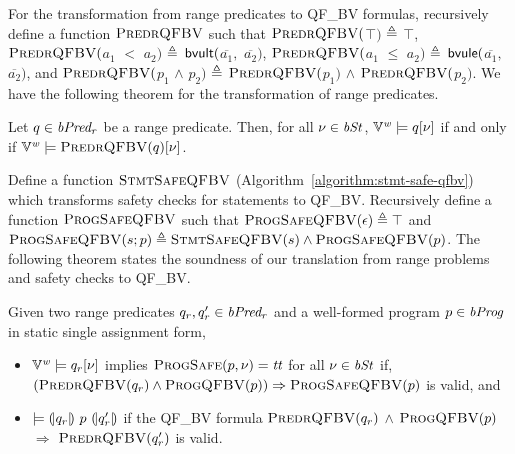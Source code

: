 For the transformation from range predicates to QF\_BV formulas, recursively define a function $\textsc{PredrQFBV}$ such that $\textsc{PredrQFBV}($$\top)$ $\triangleq$ $\top$, $\textsc{PredrQFBV}($$a_1$ $<$ $a_2)$ $\triangleq$ $\mbox{\textsf{bvult}}($$\overline{a_1},$ $\overline{a_2})$, $\textsc{PredrQFBV}($$a_1$ $\leq$ $a_2)$ $\triangleq$ $\mbox{\textsf{bvule}}($$\overline{a_1},$ $\overline{a_2})$, and $\textsc{PredrQFBV}($$p_1$ $\wedge$ $p_2)$ $\triangleq$ $\textsc{PredrQFBV}($$p_1)$ $\wedge$ $\textsc{PredrQFBV}($$p_2)$.
We have the following theorem for the transformation of range predicates.

\begin{theorem}
Let $q \in \mathit{bPred_r}$ be a range predicate.
Then, for all $\nu \in \mathit{bSt}$, $\mathbb{V}^{\mathit{w}} \models q[\nu]$ if and only if $\mathbb{V}^{\mathit{w}} \models \textsc{PredrQFBV}(q)[\nu]$.
\end{theorem}

Define a function $\textsc{StmtSafeQFBV}$ (Algorithm~\ref{algorithm:stmt-safe-qfbv}) which transforms safety checks for statements to QF\_BV.
Recursively define a function $\textsc{ProgSafeQFBV}$ such that $\textsc{ProgSafeQFBV}(\epsilon) \triangleq \top$ and $\textsc{ProgSafeQFBV}(s; p) \triangleq \textsc{StmtSafeQFBV}(s) \wedge \textsc{ProgSafeQFBV}(p)$.
The following theorem states the soundness of our translation from range problems and safety checks to QF\_BV.

\begin{theorem}
Given two range predicates $q_r, q_r' \in \mathit{bPred_r}$ and a well-formed program $p \in \mathit{bProg}$ in static single assignment form,
\begin{itemize}
\item $\mathbb{V}^{\mathit{w}} \models q_r[\nu]$ implies $\textsc{ProgSafe}(p, \nu) = \mathit{tt}$ for all $\nu \in \mathit{bSt}$ if, $(\textsc{PredrQFBV}(q_r) \wedge \textsc{ProgQFBV}(p)) \Rightarrow \textsc{ProgSafeQFBV}(p)$ is valid, and
\item $\models {(\!|}{q_r}{|\!)}~{p}~{(\!|}{q_r'}{|\!)}$ if the QF\_BV formula $\textsc{PredrQFBV}(q_r)$ $\wedge$ $\textsc{ProgQFBV}(p)$ $\Rightarrow$ $\textsc{PredrQFBV}(q_r')$ is valid.
\end{itemize}
\label{theorem:to-qfbv}
\end{theorem}


